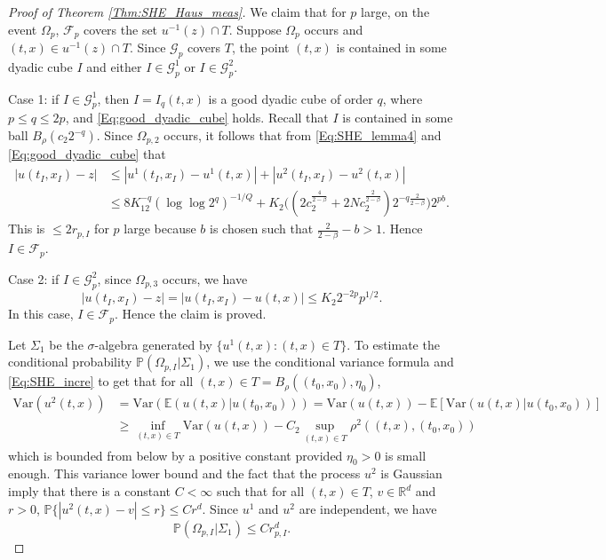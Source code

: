 \documentclass[11pt, reqno]{amsart}
\def\R{{\mathbb R}}
\def\E{{\mathbb E}}
\def\P{{\mathbb P}}
\numberwithin{equation}{section}
\begin{document}
\begin{proof}[Proof of Theorem \ref{Thm:SHE_Haus_meas}]
We claim that for $p$ large, on the event $\Omega_p$, $\mathscr{F}_p$ covers the set $u^{-1}(z) \cap T$.
Suppose $\Omega_p$ occurs and $(t, x) \in u^{-1}(z) \cap T$. 
Since $\mathscr{G}_p$ covers $T$, the point $(t, x)$ is 
contained in some dyadic cube $I$ and either $I \in \mathscr{G}_p^1$ or $I \in \mathscr{G}_p^2$. 

Case 1: if $I \in \mathscr{G}_p^1$, then $I = I_q(t, x)$ is a good dyadic cube of order $q$, where $p \le q \le 2p$, 
and \eqref{Eq:good_dyadic_cube} holds. 
Recall that $I$ is contained in some ball $B_\rho(c_2 2^{-q})$.
Since $\Omega_{p,2}$ occurs, it follows that from \eqref{Eq:SHE_lemma4} and \eqref{Eq:good_dyadic_cube} that
\begin{align*}
|u(t_I, x_I) - z| &\le |u^1(t_I, x_I) - u^1(t, x)| + |u^2(t_I, x_I) - u^2(t, x)|\\
& \le 8 K_12^{-q}(\log\log2^q)^{-1/Q} + K_2 \Big( (2 c_2^{\frac{4}{2-\beta}}+2N c_2^{\frac{2}{2-\beta}}) 2^{-q\frac{2}{2-\beta}} \Big) 2^{pb}.
\end{align*}
This is $\le 2 r_{p, I}$ for $p$ large because $b$ is chosen such that $\frac{2}{2-\beta} - b > 1$.
Hence $I \in \mathscr{F}_p$.

Case 2: if $I \in \mathscr{G}_p^2$, since $\Omega_{p,3}$ occurs, we have
\[ |u(t_I, x_I) - z| = |u(t_I, x_I) - u(t, x)| \le K_2 2^{-2p}p^{1/2}. \] 
In this case, $I \in \mathscr{F}_p$. Hence the claim is proved.

Let $\Sigma_1$ be the $\sigma$-algebra generated by $\{ u^1(t, x) : (t, x) \in T\}$.
To estimate the conditional probability $\P(\Omega_{p,I}|\Sigma_1)$, we use the conditional variance formula and 
\eqref{Eq:SHE_incre} to get 
that for all $(t, x) \in T = B_\rho((t_0, x_0), \eta_0)$, 
\begin{align*}
\mathrm{Var}(u^2(t, x)) &=
\mathrm{Var}(\E(u(t, x)|u(t_0, x_0))) = \mathrm{Var}(u(t, x)) - \E[\mathrm{Var}(u(t, x)|u(t_0, x_0))]\\
& \ge \inf_{(t, x) \in T} \mathrm{Var}(u(t, x)) - C_2 \sup_{(t, x) \in T} \rho^2((t, x),(t_0, x_0))
\end{align*}
which is bounded from below by a positive constant provided $\eta_0 > 0$ is small enough.
This variance lower bound and the fact that the process $u^2$ is Gaussian imply that there is a 
constant $C < \infty$ such that for all $(t, x) \in T$, $v \in \R^d$ and $r > 0$, $\P\{|u^2(t, x) - v| \le r\} \le C r^d$.
Since $u^1$ and $u^2$ are independent, we have
\begin{equation}\label{Eq:cond_prob}
\P(\Omega_{p,I}|\Sigma_1) \le C r_{p,I}^d.
\end{equation}


\end{proof}
\end{document}
